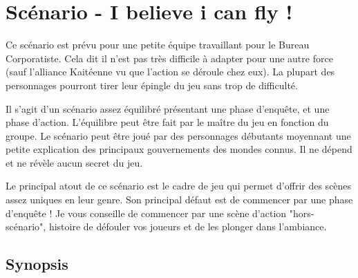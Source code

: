 \part{Scénario - I believe i can fly !}

Ce scénario est prévu pour une petite équipe travaillant pour le Bureau Corporatiste. Cela dit il n'est pas très difficile à adapter pour une autre force (sauf l'alliance Kaitéenne vu que l'action se déroule chez eux). La plupart des personnages pourront tirer leur épingle du jeu sans trop de difficulté.

Il s'agit d'un scénario assez équilibré présentant une phase d'enquête, et une phase d'action. L'équilibre peut être fait par le maître du jeu en fonction du groupe. Le scénario peut être joué par des personnages débutants moyennant une petite explication des principaux gouvernements des mondes connus. Il ne dépend et ne révèle aucun secret du jeu.

Le principal atout de ce scénario est le cadre de jeu qui permet d'offrir des scènes assez uniques en leur genre. Son principal défaut est de commencer par une phase d'enquête ! Je vous conseille de commencer par une scène d'action "hors-scénario", histoire de défouler vos joueurs et de les plonger dans l'ambiance.

\chapter{Synopsis}

